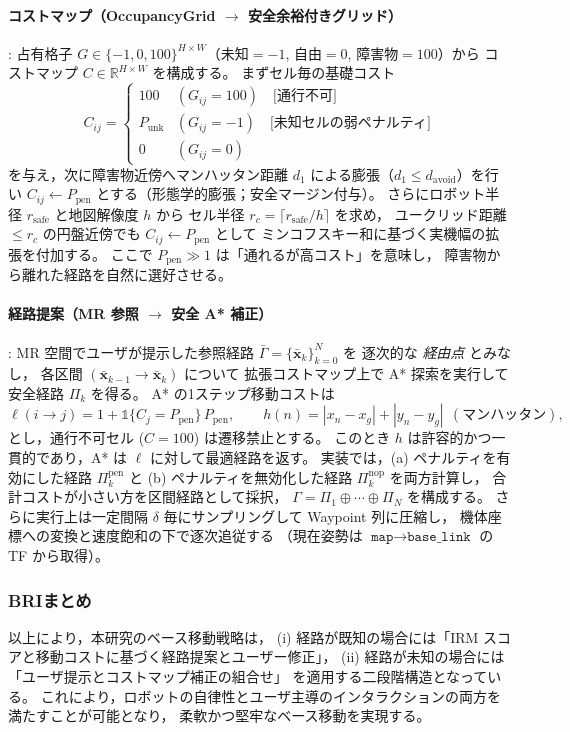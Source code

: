 \documentclass[../../main.tex]{subfiles} %
\begin{document}
\paragraph{コストマップ（OccupancyGrid $\rightarrow$ 安全余裕付きグリッド）}:
占有格子 $G\in\{-1,0,100\}^{H\times W}$（未知$=-1$, 自由$=0$, 障害物$=100$）から
コストマップ $C\in\mathbb{R}^{H\times W}$ を構成する。
まずセル毎の基礎コスト
\[
C_{ij}=
\begin{cases}
100 & (G_{ij}=100)\quad \text{[通行不可]}\\
P_{\text{unk}} & (G_{ij}=-1)\quad \text{[未知セルの弱ペナルティ]}\\
0 & (G_{ij}=0)
\end{cases}
\]
を与え，次に障害物近傍へマンハッタン距離 $d_1$ による膨張（$d_1\le d_{\text{avoid}}$）を行い
$C_{ij}\leftarrow P_{\text{pen}}$ とする（形態学的膨張；安全マージン付与）。
さらにロボット半径 $r_{\text{safe}}$ と地図解像度 $h$ から
セル半径 $r_c=\lceil r_{\text{safe}}/h\rceil$ を求め，
ユークリッド距離 $\le r_c$ の円盤近傍でも $C_{ij}\leftarrow P_{\text{pen}}$ として
ミンコフスキー和に基づく実機幅の拡張を付加する。
ここで $P_{\text{pen}}\gg 1$ は「通れるが高コスト」を意味し，
障害物から離れた経路を自然に選好させる。

\paragraph{経路提案（MR 参照 $\rightarrow$ 安全 A* 補正）}:
MR 空間でユーザが提示した参照経路 $\bar{\Gamma}=\{\bar{\mathbf{x}}_k\}_{k=0}^{N}$ を
逐次的な \emph{経由点} とみなし，
各区間 $(\bar{\mathbf{x}}_{k-1}\!\to\!\bar{\mathbf{x}}_{k})$ について
拡張コストマップ上で A* 探索を実行して安全経路 $\Pi_k$ を得る。
A* の1ステップ移動コストは
\[
\ell(i\!\to\!j)=1+\mathbb{1}\{C_j=P_{\text{pen}}\}\,P_{\text{pen}},
\qquad
h(n)=|x_n-x_g|+|y_n-y_g| \ \ (\text{マンハッタン}),
\]
とし，通行不可セル ($C=100$) は遷移禁止とする。
このとき $h$ は許容的かつ一貫的であり，A* は $\ell$ に対して最適経路を返す。
実装では，(a) ペナルティを有効にした経路 $\Pi_k^{\text{pen}}$ と
(b) ペナルティを無効化した経路 $\Pi_k^{\text{nop}}$ を両方計算し，
合計コストが小さい方を区間経路として採択，
$\Gamma=\Pi_1\oplus\cdots\oplus\Pi_N$ を構成する。
さらに実行上は一定間隔 $\delta$ 毎にサンプリングして Waypoint 列に圧縮し，
機体座標への変換と速度飽和の下で逐次追従する
（現在姿勢は $\texttt{map}\!\to\!\texttt{base\_link}$ の TF から取得）。

\subsubsection{BRIまとめ}
以上により，本研究のベース移動戦略は，
(i) 経路が既知の場合には「IRM スコアと移動コストに基づく経路提案とユーザー修正」，
(ii) 経路が未知の場合には「ユーザ提示とコストマップ補正の組合せ」
を適用する二段階構造となっている。
これにより，ロボットの自律性とユーザ主導のインタラクションの両方を満たすことが可能となり，
柔軟かつ堅牢なベース移動を実現する。
\end{document}
